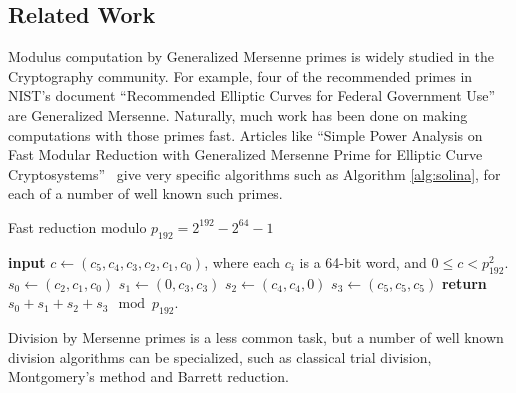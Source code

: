 
\subsection{Related Work}

Modulus computation by Generalized Mersenne primes is widely studied in the Cryptography community.
For example, four of the recommended primes in NIST's document ``Recommended Elliptic Curves for Federal Government Use'' are Generalized Mersenne.
Naturally, much work has been done on making computations with those primes fast.
Articles like ``Simple Power Analysis on Fast Modular Reduction with Generalized Mersenne Prime for Elliptic Curve Cryptosystems''~\cite{sakai2006simple}
give very specific algorithms such as Algorithm \ref{alg:solina}, for each of a number of well known such primes.

\begin{algorithm}\label{alg:solina}
   \caption{Fast reduction modulo $p_{192} = 2^{192} - 2^{64} - 1$}
   \begin{algorithmic}
      \State \textbf{input} $c \gets (c_5, c_4, c_3, c_2, c_1, c_0)$, where each $c_i$ is a 64-bit word, and $0 \le c < p^2_{192}$.
      \State $s_0 \gets (c_2, c_1, c_0)$
      \State $s_1 \gets (0, c_3, c_3)$
      \State $s_2 \gets (c_4, c_4, 0)$
      \State $s_3 \gets (c_5, c_5, c_5)$
      \State \textbf{return} $s_0 + s_1 + s_2 + s_3 \mod p_{192}$.
   \end{algorithmic}
\end{algorithm}

Division by Mersenne primes is a less common task, but a number of well known division algorithms can be specialized, such as 
 classical trial division, Montgomery's method and Barrett reduction.




